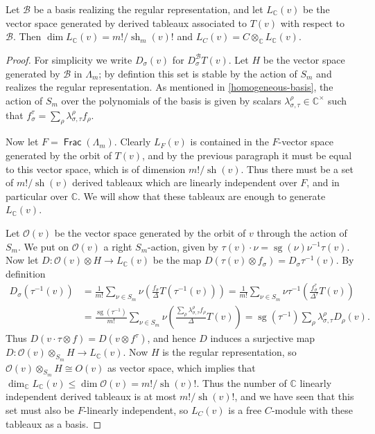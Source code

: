 \documentclass[11pt,fleqn]{article}
\newcommand\CC{\mathbb C}
\newcommand\B{\mathcal B}
\renewcommand\O{\mathcal O}
\newcommand\ot{\otimes}
\renewcommand\to{\longrightarrow}
\DeclareMathOperator\Frac{\mathsf{Frac}}
\DeclareMathOperator\sg{sg}
\DeclareMathOperator\sh{sh}
\begin{document}
\begin{Lemma}
Let $\B$ be a basis realizing the regular representation, and let $L_\CC(v)$
be the vector space generated by derived tableaux associated to $T(v)$ with
respect to $\B$. Then $\dim L_\CC(v) = m!/\sh_m(v)!$ and $L_C(v) = C \ot_\CC
L_\CC(v)$.
\end{Lemma}
\begin{proof}
For simplicity we write $D_\sigma(v)$ for $D_\sigma^\B T(v)$.
Let $H$ be the vector space generated by $\B$ in $\Lambda_m$; by defintion 
this set is stable by the action of $S_m$ and realizes the regular 
representation. As mentioned in \ref{homogeneous-basis}, the action of $S_m$
over the polynomials of the basis is given by scalars 
$\lambda_{\sigma, \tau}^\rho \in \CC^\times$ such that $f_\sigma^\tau = 
\sum_\rho \lambda_{\sigma, \tau}^\rho f_\rho$. 

Now let $F = \Frac(\Lambda_m)$. Clearly $L_F(v)$ is contained in the $F$-vector
space generated by the orbit of $T(v)$, and by the previous paragraph it must
be equal to this vector space, which is of dimension $m!/\sh(v)$. Thus there 
must be a set of $m!/\sh(v)$ derived tableaux which are linearly independent 
over $F$, and in particular over $\CC$. We will show that these tableaux are
enough to generate $L_\CC(v)$.

Let $\O(v)$ be the vector space generated by the orbit of $v$ through the 
action of $S_m$. We put on $\O(v)$ a right $S_m$-action, given by $\tau(v) 
\cdot \nu = \sg(\nu) \nu^{-1}\tau(v)$. Now let $D: \O(v) \ot H \to L_\CC(v)$
be the map $D(\tau(v) \ot f_\sigma) = D_\sigma \tau^{-1}(v)$. By definition
\begin{align*}
D_\sigma (\tau^{-1}(v))
	&= \frac{1}{m!} \sum_{\nu \in S_m} 
		\nu \left(\frac{f_\sigma}{\Delta}T(\tau^{-1}(v))\right)
	= \frac{1}{m!} \sum_{\nu \in S_m} 
		\nu \tau^{-1} \left(\frac{f_\sigma^\tau}{\Delta^\tau}T(v)\right) \\
	&= \frac{\sg(\tau^{-1})}{m!} \sum_{\nu \in S_m} 
		\nu \left(\frac{\sum_\rho \lambda^\rho_{\sigma, \tau} f_\rho}{\Delta}
			T(v)\right)
	= \sg(\tau^{-1}) \sum_\rho \lambda_{\sigma, \tau}^\rho D_\rho (v). 
\end{align*} 
Thus $D(v \cdot \tau \ot f) = D(v \ot f^\tau)$, and hence $D$ induces a
surjective map $D: \O(v) \ot_{S_m} H \to L_\CC(v)$. Now $H$ is the regular
representation, so $\O(v) \ot_{S_m} H \cong O(v)$ as vector space, which 
implies that $\dim_\CC L_\CC(v) \leq \dim \O(v) = m!/\sh(v)!$. Thus the number 
of $\CC$ linearly independent derived tableaux is at most $m!/\sh(v)!$, and we 
have seen that this set must also be $F$-linearly independent, so $L_C(v)$ is 
a free $C$-module with these tableaux as a basis.
\end{proof}
\end{document}
